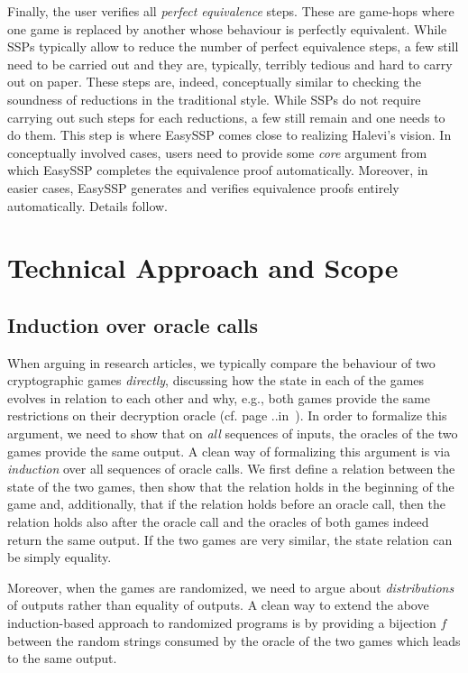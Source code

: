 Finally, the user verifies all \emph{perfect equivalence} steps. These are game-hops where one game is replaced by another whose behaviour is perfectly equivalent. While SSPs typically allow to reduce the number of perfect equivalence steps, a few still need to be carried out and they are, typically, terribly tedious and hard to carry out on paper. These steps are, indeed, conceptually similar to checking the soundness of reductions in the traditional style. While SSPs do not require carrying out such steps for each reductions, a few still remain and one needs to do them. This step is where EasySSP comes close to realizing Halevi's vision. In conceptually involved cases, users need to provide some \emph{core} argument from which EasySSP completes the equivalence proof automatically. Moreover, in easier cases, EasySSP  generates and verifies equivalence proofs entirely automatically. Details follow.

\section{Technical Approach and Scope}
\subsection{Induction over oracle calls}
When arguing in research articles, we typically compare the behaviour of
two cryptographic games \emph{directly}, discussing how the state in each
of the games evolves in relation to each other and why, e.g., both games
provide the same restrictions on their decryption oracle (cf. page ..in~\cite{X}).
In order to formalize this argument, we need to show that on \emph{all} sequences of inputs, the oracles of the two games provide the same output. A clean way of formalizing this argument is via \emph{induction} over all sequences of oracle calls. We first define a relation between the state of the two games, then show that the relation holds in the beginning of the game and, additionally, that if the relation holds before an oracle call, then the relation holds also after the oracle call and the oracles of both games indeed return the same output. If the two games are very similar, the state relation can be simply equality.

Moreover, when the games are randomized, we need to argue about \emph{distributions}
of outputs rather than equality of outputs. A clean way to extend the above induction-based approach to randomized programs is by providing a bijection $f$ between
the random strings consumed by the oracle of the two games which leads to the
same output.

